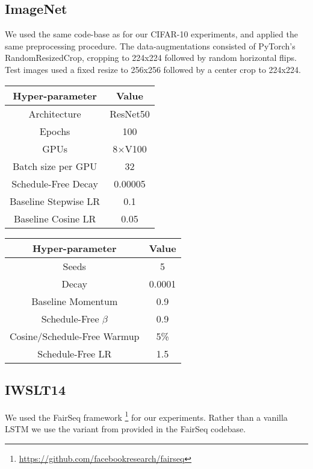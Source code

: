 \documentclass{article}
\begin{document}
\subsection{ImageNet}
We used the same code-base as for our CIFAR-10 experiments, and applied the same preprocessing procedure. The data-augmentations consisted of PyTorch's RandomResizedCrop, cropping to 224x224 followed by random horizontal flips.
Test images used a fixed resize to 256x256 followed by a center crop to 224x224.

\begin{tabular}[t]{|c|c|}
\hline 
\textbf{Hyper-parameter}  & \textbf{Value}\tabularnewline
\hline
Architecture  & ResNet50\tabularnewline
\hline 
Epochs  & 100\tabularnewline
\hline 
GPUs  & 8$\times $V100\tabularnewline
\hline 
Batch size per GPU  & 32\tabularnewline
\hline 
Schedule-Free Decay & 0.00005 \tabularnewline
\hline
Baseline Stepwise LR & 0.1 \tabularnewline
\hline
Baseline Cosine LR & 0.05 \tabularnewline
\hline
\end{tabular}
\quad
\begin{tabular}[t]{|c|c|}
\hline
\textbf{Hyper-parameter}  & \textbf{Value}\tabularnewline
\hline  
Seeds & 5\tabularnewline
\hline 
Decay & 0.0001\tabularnewline
\hline 
Baseline Momentum & 0.9\tabularnewline
\hline 
Schedule-Free $\beta$ & 0.9 \tabularnewline
\hline
Cosine/Schedule-Free Warmup & 5\% \tabularnewline
\hline
Schedule-Free LR & 1.5 \tabularnewline
\hline
\end{tabular}

\subsection{IWSLT14}
We used the FairSeq framework \footnote{\url{https://github.com/facebookresearch/fairseq}} for our experiments. Rather than a vanilla LSTM we use the variant from \citet{wiseman-rush-2016-sequence} provided in the FairSeq codebase.
\end{document}
